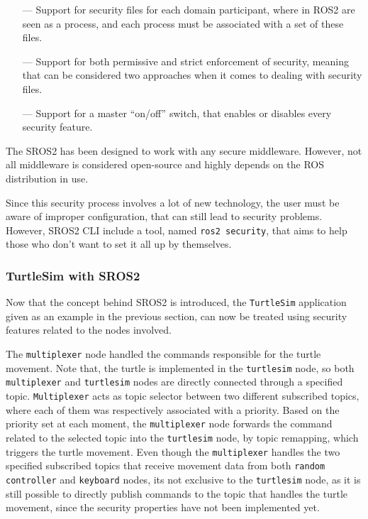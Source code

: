 \begin{itemize}
    \item[---] Support for security files for each domain participant, where in ROS2 are seen as a process, and each process must be associated with a set of these files.
    \item[---] Support for both permissive and strict enforcement of security, meaning that can be considered two approaches when it comes to dealing with security files.
    \item[---] Support for a master “on/off” switch, that enables or disables every security feature.
\end{itemize}

The SROS2 has been designed to work with any secure middleware. However, not all middleware is considered open-source and highly depends on the ROS distribution in use.

Since this security process involves a lot of new technology, the user must be aware of improper configuration, that can still lead to security problems. However, SROS2 CLI include a tool, named \texttt{ros2 security}, that aims to help those who don’t want to set it all up by themselves.

\subsubsection{TurtleSim with SROS2}
            
Now that the concept behind SROS2 is introduced, the \texttt{TurtleSim} application given as an example in the previous section, can now  be treated using security features related to the nodes involved.

The \texttt{multiplexer} node handled the commands responsible for the turtle movement. Note that, the turtle is implemented in the \texttt{turtlesim} node, so both \texttt{multiplexer} and \texttt{turtlesim} nodes are directly connected through a specified topic. \texttt{Multiplexer} acts as topic selector between two different subscribed topics, where each of them was respectively associated with a priority. Based on the priority set at each moment, the \texttt{multiplexer} node forwards the command related to the selected topic into the \texttt{turtlesim} node, by topic remapping, which triggers the turtle movement. Even though the \texttt{multiplexer} handles the two specified subscribed topics that receive movement data from both \texttt{random controller} and \texttt{keyboard} nodes, its not exclusive to the \texttt{turtlesim} node, as it is still possible to directly publish commands to the topic that handles the turtle movement, since the security properties have not been implemented yet.

